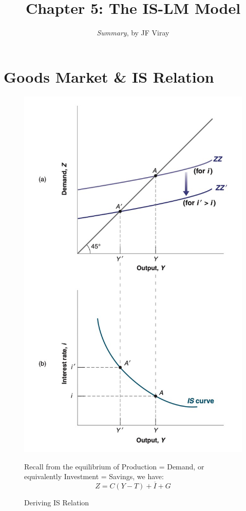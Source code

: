 \documentclass{extarticle}
\title{\vspace{-2em}Chapter 5: The IS-LM Model}
\author{\emph{Summary}, by JF Viray}
\date{}
\begin{document}
\maketitle



\section{Goods Market \& IS Relation}

\begin{figure}[h]
  \centering
  \begin{minipage}{0.4\linewidth}
    \includegraphics[width=\linewidth]{IS.png}
    \caption{Deriving IS Relation}
    \label{fig:IS}
  \end{minipage}%
  \hfill
  \begin{minipage}{0.6\linewidth}
    Recall from the equilibrium of Production = Demand, or equivalently Investment = Savings, we have:
    $$Z = C(Y-T) + \overline{I} + G$$


\end{minipage}
\end{figure}
\end{document}
